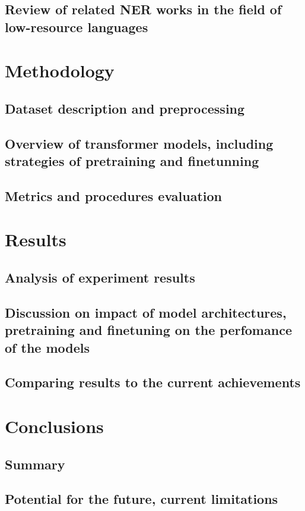 \documentclass[a4paper,12pt]{report}
\begin{document}
\section{Review of related NER works in the field of low-resource languages}


\chapter{Methodology}\label{cap:methodology}
\section{Dataset description and preprocessing}
\section{Overview of transformer models, including strategies of pretraining and finetunning}
\section{Metrics and procedures evaluation}


\chapter{Results}\label{cap:results}
\section{Analysis of experiment results}
\section{Discussion on impact of model architectures, pretraining and finetuning on the perfomance of the models}
\section{Comparing results to the current achievements}


\chapter{Conclusions}\label{cap:conclusions}
\section{Summary}
\section{Potential for the future, current limitations}



    
    
\end{document}

